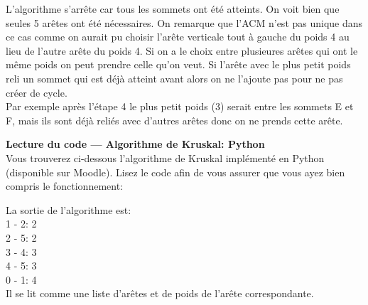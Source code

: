\begin{Exercice}[5 minutes]
\begin{solution}
\begin{center}
\end{center}
\end{solution}
\begin{solution}
        L'algorithme s'arrête car tous les sommets ont été atteints. On voit bien que seules 5 arêtes ont été nécessaires. On remarque que l'ACM n'est pas unique dans ce cas comme on aurait pu choisir l'arête verticale tout à gauche du poids 4 au lieu de l'autre arête du poids 4.
        Si on a le choix entre plusieures arêtes qui ont le même poids on peut prendre celle qu'on veut. Si l'arête avec le plus petit poids reli un sommet qui est déjà atteint avant alors on ne l'ajoute pas pour ne pas créer de cycle. \\
        Par exemple après l'étape 4 le plus petit poids (3) serait entre les sommets E et F, mais ils sont déjà reliés avec d'autres arêtes donc on ne prends cette arête.
    \end{solution}
\end{Exercice}
\begin{Exercice}[30 minutes] \textbf{Lecture du code — Algorithme de Kruskal\!: Python}\\
    Vous trouverez ci-dessous l'algorithme de Kruskal implémenté en Python (disponible sur Moodle). Lisez le code afin de vous assurer que vous ayez bien compris le fonctionnement\!:\\
    
    \begin{conseil}
        La sortie de l'algorithme est\!: \\
        1 - 2: 2 \\ 
        2 - 5: 2 \\
        3 - 4: 3 \\
        4 - 5: 3 \\ 
        0 - 1: 4 \\
        Il se lit comme une liste d'arêtes et de poids de l'arête correspondante.
    \end{conseil}
\end{Exercice}


